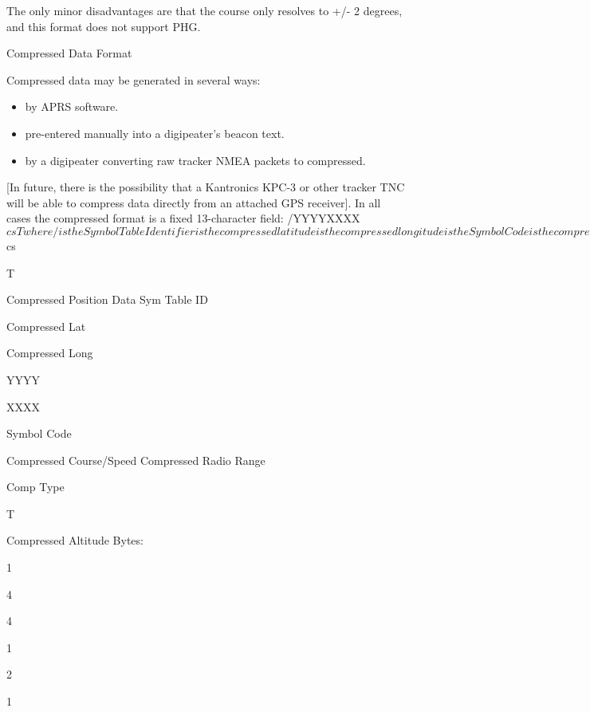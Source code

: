 The only minor disadvantages are that the course only resolves to +/- 2
degrees, and this format does not support PHG.



Compressed Data
Format

Compressed data may be generated in several ways:

\begin{itemize}
    
\item by APRS software.

\item pre-entered manually into a digipeater’s beacon text.

\item by a digipeater converting raw tracker NMEA packets to compressed.

\end{itemize}


[In future, there is the possibility that a Kantronics KPC-3 or other tracker
TNC will be able to compress data directly from an attached GPS receiver].
In all cases the compressed format is a fixed 13-character field:
/YYYYXXXX$csT

where /

is the Symbol Table Identifier
is the compressed latitude
is the compressed longitude
is the Symbol Code
is the compressed course/speed or
compressed pre-calculated radio range or
compressed altitude
is the compression type indicator

YYYY
XXXX
$
cs

T

Compressed Position Data
Sym
Table
ID

Compressed
Lat

Compressed
Long

YYYY

XXXX

Symbol
Code

Compressed
Course/Speed
Compressed Radio
Range

Comp
Type

T

Compressed
Altitude
Bytes:

1

4

4

1

2

1

